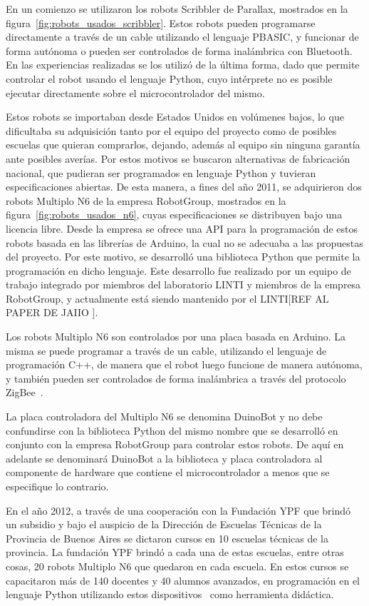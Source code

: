 En un comienzo se utilizaron los robots Scribbler de Parallax, mostrados en la figura~\ref{fig:robots_usados_scribbler}. Estos robots pueden programarse directamente a través de un cable utilizando  el lenguaje
PBASIC, y funcionar de forma autónoma o pueden ser controlados de forma
inalámbrica con Bluetooth. En las experiencias realizadas se los utilizó de la última
forma, dado  que permite controlar el robot usando el lenguaje Python, cuyo intérprete no
es posible ejecutar directamente sobre el microcontrolador del mismo.

Estos robots se importaban desde Estados Unidos en volúmenes bajos, lo que
dificultaba su adquisición tanto por el equipo del proyecto como de posibles escuelas que quieran comprarlos, dejando, además al equipo sin ninguna garantía ante posibles 
averías. Por estos motivos se buscaron alternativas de fabricación nacional,
que pudieran ser programados en lenguaje Python y tuvieran especificaciones abiertas.
De esta manera, a fines del año 2011, se adquirieron dos robots Multiplo N6
de la empresa RobotGroup, mostrados en la figura~\ref{fig:robots_usados_n6},
cuyas especificaciones se distribuyen bajo una licencia libre. Desde la empresa se 
ofrece una API para la programación de estos robots basada en las librerías de Arduino,
la cual no se adecuaba a las propuestas del proyecto. Por este motivo, se desarrolló
una biblioteca Python que permite la programación en dicho lenguaje. Este
desarrollo fue realizado por un equipo de trabajo integrado por miembros del
laboratorio LINTI y miembros de la empresa RobotGroup, y actualmente está
siendo mantenido por el LINTI[REF AL PAPER DE JAIIO ]. 

Los robots Multiplo N6 son
controlados por una placa basada en Arduino. La misma se puede programar
a través de un cable, utilizando el lenguaje de programación C++, de manera que el robot luego funcione
de manera autónoma,  y también pueden ser controlados de forma inalámbrica
a través del protocolo ZigBee~\citep{diaz_aprendiendo_2012}. 

La placa
controladora del Multiplo N6 se denomina DuinoBot y no debe confundirse con la biblioteca
Python del mismo nombre que se desarrolló en conjunto con la empresa RobotGroup
para controlar estos robots. De aquí en adelante se denominará DuinoBot a la
biblioteca y placa controladora al componente de hardware que contiene el
microcontrolador a menos que se especifique lo contrario.



En el año 2012, a través de una cooperación con la Fundación YPF que brindó
un subsidio y bajo el auspicio de la Dirección de Escuelas Técnicas de la
Provincia de Buenos Aires se dictaron cursos en 10 escuelas técnicas de la
provincia. La fundación YPF brindó a cada una de estas escuelas, entre otras
cosas, 20 robots Multiplo N6 que quedaron en cada escuela. En estos cursos
se capacitaron más de 140 docentes y 40 alumnos avanzados, en programación en el lenguaje Python utilizando 
estos dispositivos~\citep{diaz_aprendiendo_2012} como herramienta didáctica.

